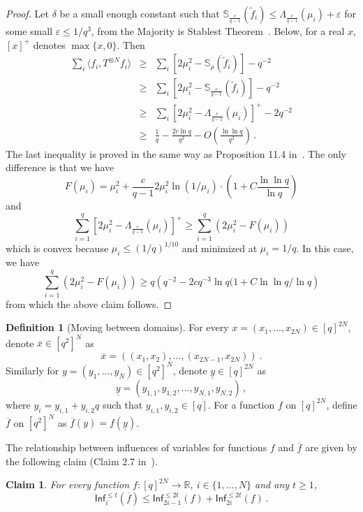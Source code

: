 \documentclass[10pt]{article}
\newtheorem{claim}[theorem]{Claim}
\theoremstyle{definition}
\newtheorem{definition}[theorem]{Definition}
\numberwithin{equation}{section}
\newcommand{\R}{{\mathbb R}}
\newcommand{\intset}[1]{\ensuremath{\{1,\ldots,{#1}\}}}
\newcommand{\infl}{\ensuremath{\mathsf{Inf}}}
\newcommand{\eps}{\varepsilon}
\renewcommand{\ge}{\geqslant}
\renewcommand{\le}{\leqslant}
\begin{document}
\begin{proof}
  Let $\delta$ be a small enough constant such that
  $\mathbb{S}_{\frac{c}{q-1}}(\tilde{f}_i) \le
  \Lambda_{\frac{c}{q-1}}(\mu_i)+\eps$ for some small $\eps\le
  {1}/{q^3}$, from the Majority is Stablest Theorem~\cite{MOO}.
  Below, for a real $x$, $[x]^+$ denotes $\max \{ x, 0\}$. Then
  \begin{eqnarray*}
    \sum_i \langle f_i, T^{\otimes N} f_i\rangle &\ge& \sum_i \left[2 \mu_i^2
      - \mathbb{S}_{\rho}(\tilde{f}_i)\right]  - q^{-2}\\
    &\ge& \sum_i \left[2 \mu_i^2 - \mathbb{S}_{\frac{c}{q-1}}(\tilde{f}_i)\right]  -
    q^{-2}\\
    &\ge& \sum_i \left[2 \mu_i^2 - \Lambda_{\frac{c}{q-1}}(\mu_i)\right]^+-2 q^{-2}\\
    &\ge& \frac{1}{q} - \frac{2 c \ln q}{q^2} - O\left(\frac{\ln\ln q}{q^2}\right)\,.
  \end{eqnarray*}
  The last inequality is proved in the same way as Proposition 11.4 in~\cite{KKMO}. The only difference is that we have
  \[ F(\mu_i) = \mu_i^2 + \frac{c}{q-1} 2 \mu_i^2 \ln(1/\mu_i)\cdot
  \left(1+C\frac{\ln\ln q}{\ln q}\right)\]
  and
  \[ \sum_{i=1}^q \left[ 2 \mu_i^2 -
    \Lambda_{\frac{c}{q-1}}(\mu_i)\right]^+ \ge \sum_{i=1}^q (2\mu_i^2
  - F(\mu_i))\] which is convex because $\mu_i\le (1/q)^{1/10}$ and
  minimized at $\mu_i=1/q$. In this case, we have
  \[ \sum_{i=1}^q (2\mu_i^2 - F(\mu_i)) \ge q\left(q^{-2} - 2 c q^{-3}
    \ln q (1 + C \ln \ln q / \ln q\right)\] from which the above claim
  follows.
\end{proof}

%
\begin{definition}[Moving between domains]
  For every $x=(x_1,\ldots,x_{2 N}) \in [q]^{2 N}$, denote
  $\overline{x} \in [q^2]^N$ as
\[ \overline{x} = ((x_1, x_2),\ldots,(x_{2 N-1},x_{2 N})) \ . \]
  Similarly for $y=(y_1,\ldots,y_{N}) \in [q^2]^{N}$, denote
  $\underline{y} \in [q]^{2 N}$ as
  \[ \underline{y} = (y_{1,1}, y_{1,2},\ldots,y_{N,1},y_{N,2})\,,\]
  where $y_i = y_{i,1} + y_{i,2} q$ such that $y_{i,1},y_{i,2}\in
  [q]$.  For a function $f$ on $[q]^{2 N}$, define $\overline{f}$ on
  $[q^2]^N$ as $\overline{f}(y) = f(\underline{y})$. 
%
\end{definition}
%
\noindent 
The relationship between influences of variables for functions $f$ and
$\overline{f}$ are given by the following claim (Claim 2.7 in~\cite{DMR}).
%
\begin{claim}\label{claim:infrel}
  For every function $f:[q]^{2N}\rightarrow \R$,
  $i\in\intset{N}$ and any $t\ge 1$,
  \[\infl_i^{\le t}(\overline{f}) \le \infl_{2i-1}^{\le 2t}(f) +
  \infl_{2i}^{\le 2t} (f)\,.\]
\end{claim}
\end{document}
